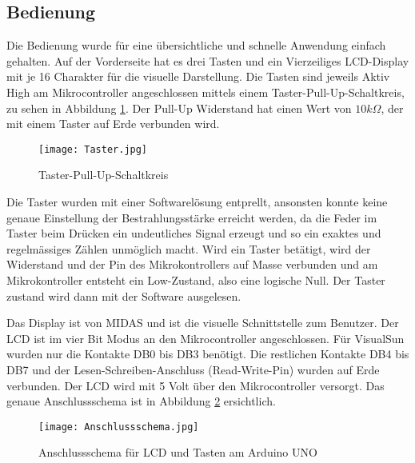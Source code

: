 \subsection{Bedienung}
Die Bedienung wurde für eine übersichtliche und schnelle Anwendung einfach gehalten. Auf der Vorderseite hat es drei Tasten und ein Vierzeiliges LCD-Display mit je 16 Charakter für die visuelle Darstellung. Die Tasten sind jeweils Aktiv High am Mikrocontroller angeschlossen mittels einem Taster-Pull-Up-Schaltkreis, zu sehen in Abbildung \ref{fig:SwitchPullUp_Software}. Der Pull-Up Widerstand hat einen Wert von $10k\Omega$, der mit einem Taster auf Erde verbunden wird.

\begin{figure}[h]
	\centering
		\texttt{[image: Taster.jpg]}
	\caption{Taster-Pull-Up-Schaltkreis}
	\label{fig:SwitchPullUp_Software}
\end{figure}

Die Taster wurden mit einer Softwarelösung entprellt, ansonsten konnte keine genaue Einstellung der Bestrahlungsstärke erreicht werden, da die Feder im Taster beim Drücken ein undeutliches Signal erzeugt und so ein exaktes und regelmässiges Zählen unmöglich macht. Wird ein Taster betätigt, wird der Widerstand und der Pin des Mikrokontrollers auf Masse verbunden und am Mikrokontroller entsteht ein Low-Zustand, also eine logische Null. Der Taster zustand wird dann mit der Software ausgelesen.

Das Display ist von MIDAS und ist die visuelle Schnittstelle zum Benutzer. Der LCD ist im vier Bit Modus an den Mikrocontroller angeschlossen. Für VisualSun wurden nur die Kontakte DB0 bis DB3 benötigt. Die restlichen Kontakte DB4 bis DB7 und der Lesen-Schreiben-Anschluss (Read-Write-Pin) wurden auf Erde verbunden. Der LCD wird mit 5 Volt über den Mikrocontroller versorgt. Das genaue Anschlussschema  ist in Abbildung \ref{fig:AnschlussSchema} ersichtlich.

\begin{figure}[h]
	\centering
		\texttt{[image: Anschlussschema.jpg]}
	\caption{Anschlussschema für LCD und Tasten am Arduino UNO}
	\label{fig:AnschlussSchema}
\end{figure}